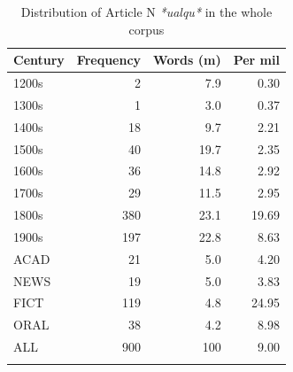\begin{table}

\begin{tabular}{lrrr}
\lsptoprule
Century &  Frequency &  Words (m) &  Per mil\\
\midrule
  1200s& 2& 7.9& 0.30\\
  1300s& 1& 3.0& 0.37\\
  1400s& 18& 9.7& 2.21\\
  1500s& 40& 19.7& 2.35\\
  1600s& 36& 14.8& 2.92\\
  1700s& 29& 11.5& 2.95\\
  1800s& 380& 23.1& 19.69\\
  1900s& 197& 22.8& 8.63\\
  \tablevspace
  ACAD& 21& 5.0& 4.20\\
  NEWS& 19& 5.0& 3.83\\
  FICT& 119& 4.8& 24.95\\
  ORAL & 38    & 4.2  & 8.98 \\
  \midrule
  ALL& 900& 100& 9.00\\
\lspbottomrule
\end{tabular}

\caption{Distribution of Article N \textit{*ualqu*} in the whole corpus}
\label{tab:extracted6}
\end{table}

